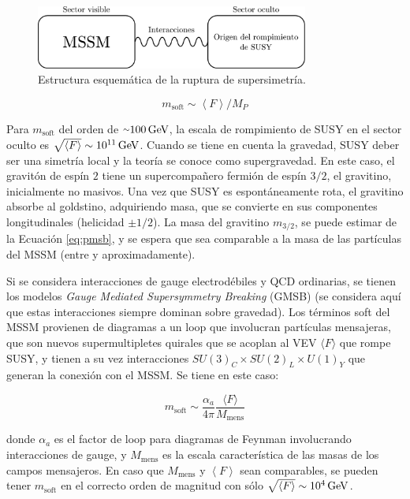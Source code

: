 
\begin{figure}
  \centering
  \includegraphics[width=0.8\textwidth]{images/theory/hidden_sec.pdf}
  \caption{Estructura esquemática de la ruptura de supersimetría.}
  \label{fig:hidden_sector}
\end{figure}

\begin{equation}
m_{\text{soft}} \sim \left< F \right>/M_P
\label{eq:pmsb}
\end{equation}

Para $m_{\text{soft}}$ del orden de ${\smallsim}100\,\gev$, la escala de rompimiento de SUSY en el sector oculto es $\sqrt{\langle F \rangle}\sim 10^{11}\,\text{GeV}$.
Cuando se tiene en cuenta la gravedad, SUSY deber ser una simetría local y la
teoría se conoce como supergravedad. En este caso, el gravitón de espín $2$ tiene un
supercompañero fermión de espín $3/2$, el gravitino, inicialmente no masivos. Una vez
que SUSY es espontáneamente rota, el gravitino absorbe al goldstino, adquiriendo
masa, que se convierte en sus componentes longitudinales (helicidad $\pm1/2$). La masa
del gravitino $m_{3/2}$, se puede estimar de la Ecuación \ref{eq:pmsb}, y se espera que sea comparable a la masa de las partículas del MSSM (entre  y  aproximadamente).

Si se considera interacciones de gauge electrodébiles y QCD ordinarias, se tienen
los modelos \textit{Gauge Mediated Supersymmetry Breaking} (GMSB) \cite{gmsb1, gmsb2, gmsb3} (se considera aquí que estas interacciones siempre dominan sobre gravedad). Los términos
soft del MSSM provienen de diagramas a un loop que involucran partículas mensajeras, que son nuevos supermultipletes quirales que se acoplan al VEV $\langle F \rangle$ que
rompe SUSY, y tienen a su vez interacciones $SU(3)_C \times SU(2)_L \times U(1)_Y$ que generan
la conexión con el MSSM. Se tiene en este caso:

\begin{equation}
m_{\text{soft}} \sim \frac{\alpha_a}{4\pi}\frac{\langle F \rangle}{M_\text{mens}}
\label{eq:gmsb}
\end{equation}

\noindent
donde $\alpha_a$ es el factor de loop para diagramas de Feynman involucrando interacciones de gauge, y $M_\text{mens}$ es la escala característica de las masas de los campos mensajeros. En
caso que $M_\text{mens}$ y $\left< F \right>$ sean comparables, se pueden tener $m_{\text{soft}}$ en el correcto
orden de magnitud con sólo $\sqrt{\left< F \right>}\sim 10^4\,\text{GeV}$.

